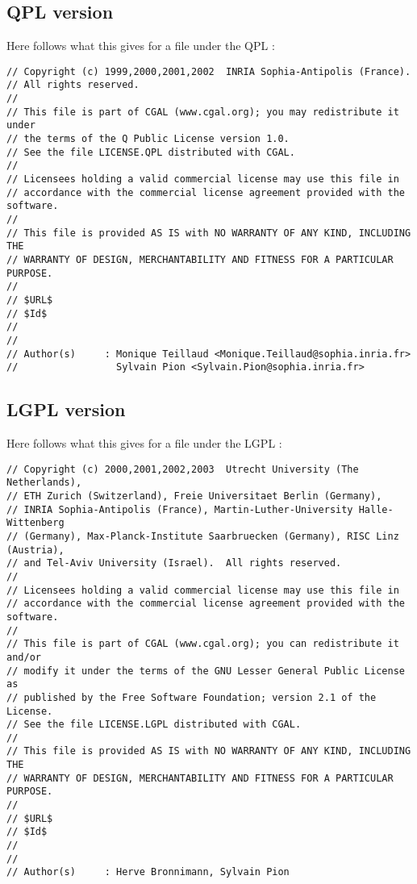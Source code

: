 \subsection*{QPL version}

Here follows what this gives for a file under the QPL :

\begin{verbatim}
// Copyright (c) 1999,2000,2001,2002  INRIA Sophia-Antipolis (France).
// All rights reserved.
//
// This file is part of CGAL (www.cgal.org); you may redistribute it under
// the terms of the Q Public License version 1.0.
// See the file LICENSE.QPL distributed with CGAL.
//
// Licensees holding a valid commercial license may use this file in
// accordance with the commercial license agreement provided with the software.
//
// This file is provided AS IS with NO WARRANTY OF ANY KIND, INCLUDING THE
// WARRANTY OF DESIGN, MERCHANTABILITY AND FITNESS FOR A PARTICULAR PURPOSE.
//
// $URL$
// $Id$
// 
//
// Author(s)     : Monique Teillaud <Monique.Teillaud@sophia.inria.fr>
//                 Sylvain Pion <Sylvain.Pion@sophia.inria.fr>
\end{verbatim}

\subsection*{LGPL version}

Here follows what this gives for a file under the LGPL :

\begin{verbatim}
// Copyright (c) 2000,2001,2002,2003  Utrecht University (The Netherlands),
// ETH Zurich (Switzerland), Freie Universitaet Berlin (Germany),
// INRIA Sophia-Antipolis (France), Martin-Luther-University Halle-Wittenberg
// (Germany), Max-Planck-Institute Saarbruecken (Germany), RISC Linz (Austria),
// and Tel-Aviv University (Israel).  All rights reserved.
//
// Licensees holding a valid commercial license may use this file in
// accordance with the commercial license agreement provided with the software.
//
// This file is part of CGAL (www.cgal.org); you can redistribute it and/or
// modify it under the terms of the GNU Lesser General Public License as
// published by the Free Software Foundation; version 2.1 of the License.
// See the file LICENSE.LGPL distributed with CGAL.
//
// This file is provided AS IS with NO WARRANTY OF ANY KIND, INCLUDING THE
// WARRANTY OF DESIGN, MERCHANTABILITY AND FITNESS FOR A PARTICULAR PURPOSE.
//
// $URL$
// $Id$
// 
//
// Author(s)     : Herve Bronnimann, Sylvain Pion
\end{verbatim}


